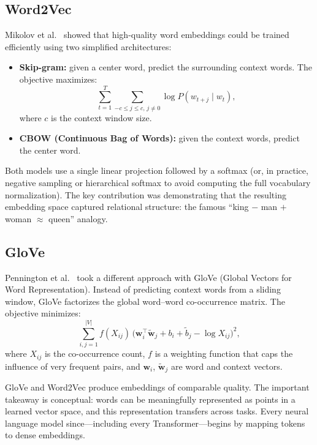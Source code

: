 \subsection{Word2Vec}

Mikolov et al.~\cite{mikolov2013efficient} showed that high-quality word embeddings could be trained efficiently using two simplified architectures:

\begin{itemize}
    \item \textbf{Skip-gram:} given a center word, predict the surrounding context words. The objective maximizes:
    \[
    \sum_{t=1}^{T} \sum_{-c \leq j \leq c,\, j \neq 0} \log P(w_{t+j} \mid w_t),
    \]
    where $c$ is the context window size.
    \item \textbf{CBOW (Continuous Bag of Words):} given the context words, predict the center word.
\end{itemize}

Both models use a single linear projection followed by a softmax (or, in practice, negative sampling or hierarchical softmax to avoid computing the full vocabulary normalization). The key contribution was demonstrating that the resulting embedding space captured relational structure: the famous ``king $-$ man $+$ woman $\approx$ queen'' analogy.

\subsection{GloVe}

Pennington et al.~\cite{pennington2014glove} took a different approach with GloVe (Global Vectors for Word Representation). Instead of predicting context words from a sliding window, GloVe factorizes the global word--word co-occurrence matrix. The objective minimizes:
\[
\sum_{i,j=1}^{|V|} f(X_{ij})\,\bigl(\mathbf{w}_i^\top \tilde{\mathbf{w}}_j + b_i + \tilde{b}_j - \log X_{ij}\bigr)^2,
\]
where $X_{ij}$ is the co-occurrence count, $f$ is a weighting function that caps the influence of very frequent pairs, and $\mathbf{w}_i$, $\tilde{\mathbf{w}}_j$ are word and context vectors.

GloVe and Word2Vec produce embeddings of comparable quality. The important takeaway is conceptual: words can be meaningfully represented as points in a learned vector space, and this representation transfers across tasks. Every neural language model since---including every Transformer---begins by mapping tokens to dense embeddings.

